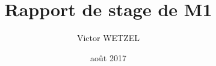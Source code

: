 

\title{Rapport de stage de M1}
\author{Victor WETZEL}
\date{août 2017}						



\title{}


\newpage
\tableofcontents

\newpage
{}%


\newpage






